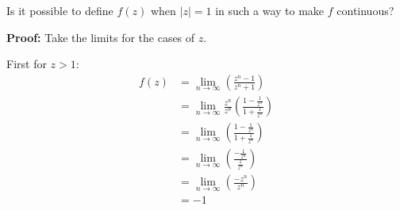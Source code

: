 \begin{enumerate}
	Is it possible to define $f(z)$ when $|z| = 1$ in such a way to make $f$ continuous?
		
	\textbf{Proof:}
	Take the limits for the cases of $z$.
	
	First for $z > 1$:
	\begin{align*}
		f(z) &= \lim_{n \to \infty} \left( \frac{z^n - 1}{z^n + 1} \right) \\
		&= \lim_{n \to \infty} \frac{z^n}{z^n} \left( \frac{1 - \frac{1}{z^n}}{1 + \frac{1}{z^n}} \right) \\
		&= \lim_{n \to \infty} \left( \frac{1 - \frac{1}{z^n}}{1 + \frac{1}{z^n}} \right) \\
		&= \lim_{n \to \infty} \left( \frac{- \frac{1}{z^n}}{\frac{1}{z^n}} \right) \\
		&= \lim_{n \to \infty} \left( \frac{- z^n}{{z^n}} \right) \\
		&= -1
	\end{align*}


\end{enumerate}
